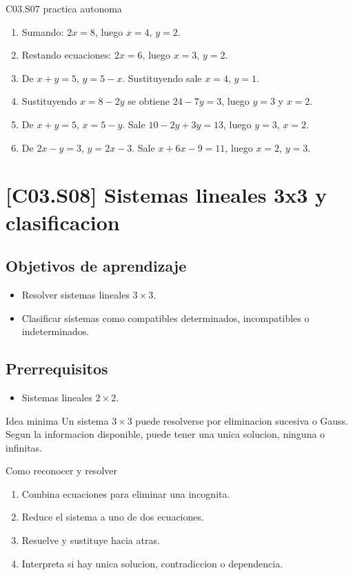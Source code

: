\begin{fullsolution}{C03.S07 practica autonoma}
\begin{enumerate}[label=\textbf{PX-C03.S07-\arabic*:}, leftmargin=*]
  \item Sumando: \(2x=8\), luego \(x=4\), \(y=2\).
  \item Restando ecuaciones: \(2x=6\), luego \(x=3\), \(y=2\).
  \item De \(x+y=5\), \(y=5-x\). Sustituyendo sale \(x=4\), \(y=1\).
  \item Sustituyendo \(x=8-2y\) se obtiene \(24-7y=3\), luego \(y=3\) y \(x=2\).
  \item De \(x+y=5\), \(x=5-y\). Sale \(10-2y+3y=13\), luego \(y=3\), \(x=2\).
  \item De \(2x-y=3\), \(y=2x-3\). Sale \(x+6x-9=11\), luego \(x=2\), \(y=3\).
\end{enumerate}
\end{fullsolution}

\section{[C03.S08] Sistemas lineales 3x3 y clasificacion}

\subsection*{Objetivos de aprendizaje}
\begin{itemize}
  \item Resolver sistemas lineales \(3\times 3\).
  \item Clasificar sistemas como compatibles determinados, incompatibles o indeterminados.
\end{itemize}

\subsection*{Prerrequisitos}
\begin{itemize}
  \item Sistemas lineales \(2\times 2\).
\end{itemize}

\begin{theorybox}{Idea minima}
Un sistema \(3\times 3\) puede resolverse por eliminacion sucesiva o Gauss. Segun la
informacion disponible, puede tener una unica solucion, ninguna o infinitas.
\end{theorybox}

\begin{methodbox}{Como reconocer y resolver}
\begin{enumerate}
  \item Combina ecuaciones para eliminar una incognita.
  \item Reduce el sistema a uno de dos ecuaciones.
  \item Resuelve y sustituye hacia atras.
  \item Interpreta si hay unica solucion, contradiccion o dependencia.
\end{enumerate}
\end{methodbox}

